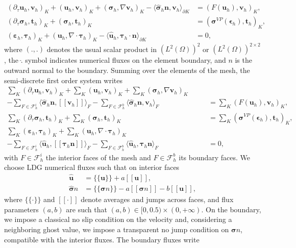 \documentclass[11pt]{article}
\newcommand{\bu}{\mathbf{u}}
\newcommand{\bt}{\mathbf{t}}
\newcommand{\sig}{\boldsymbol{\sigma}}
\newcommand{\beps}{\boldsymbol{\varepsilon}}
\newcommand{\ljp}{ [\![ }
\newcommand{\rjp}{ ]\!] }
\begin{document}
\begin{align}
 ( \partial_\tau \mathbf{u}_h, \mathbf{v}_h)_K + ( \mathbf{u}_h, \mathbf{v}_h)_K+ (\boldsymbol{\sigma}_h, \nabla \mathbf{v}_h)_K-
\langle \widehat{\boldsymbol{\sigma}}_h  \mathbf{n}, \mathbf{v}_h \rangle_{\partial K}& = ( F(\mathbf{u}_h), \mathbf{v}_h)_K, \\
 (\partial_\tau \boldsymbol{\sigma}_h, \bt_h)_K
+
(\boldsymbol{\sigma}_h, \bt_h)_K
&= (\boldsymbol{\sigma}^{VP}(\mathbf{\epsilon}_h), \bt_h)_K,  \\
   (\mathbf{\beps}_h, \boldsymbol{\tau}_h)_K
+(\mathbf{u}_h, \nabla \cdot \boldsymbol{\tau}_h)_K-
\langle \widehat{\mathbf{u}}_h, \boldsymbol{\tau}_h \cdot \mathbf{n} \rangle_{\partial K}&=0,
\end{align}
where $(.,.)$ denotes the usual scalar product in $(L^2(\Omega))^2$ or $(L^2(\Omega))^{2\times2}$, the $\hat{.}$ symbol indicates numerical fluxes on the element boundary, and $n$ is the outward normal to the boundary. Summing over the elements of the mesh, the semi-discrete first order system writes 
\begin{align}
 \sum_{K} ( \partial_\tau \mathbf{u}_h, \mathbf{v}_h)_K+ \sum_{K} (\mathbf{u}_h, \mathbf{v}_h)_K
+ \sum_{K} (\boldsymbol{\sigma}_h, \nabla \mathbf{v}_h)_K
\qquad \nonumber
\\
-\sum_{F \in \mathcal{F}_h^i} \langle \widehat{\boldsymbol{\sigma}}_h \mathbf{n}, \ljp \mathbf{v}_h  \rjp\rangle_{F} -\sum_{F \in \mathcal{F}_h^b} \langle \widehat{\boldsymbol{\sigma}}_h \mathbf{n}, \mathbf{v}_h \rangle_{F}
&= \sum_{K} (F(\bu_h), \mathbf{v}_h)_K, \label{u line}
\\
 \sum_K (\partial_\tau \boldsymbol{\sigma}_h, \bt_h)_K
+
\sum_K (\boldsymbol{\sigma}_h, \bt_h)_K
&= \sum_K (\boldsymbol{\sigma}^{VP}(\mathbf{\epsilon}_h), \bt_h)_K, \label{sig line}\\
 \sum_{K} (\beps_h, \boldsymbol{\tau}_h)_K
+ \sum_{K} (\bu_h, \nabla \cdot \boldsymbol{\tau}_h)_K \qquad\qquad\nonumber\\
- \sum_{F \in \mathcal{F}_h^i} \langle \widehat{\mathbf{u}}_h, \ljp \boldsymbol{\tau}_h \mathbf{n} \rjp \rangle_{F} - \sum_{F \in \mathcal{F}_h^b} \langle \widehat{\mathbf{u}}_h,  \boldsymbol{\tau}_h \mathbf{n} \rangle_{F}&=0, \label{eps line}
\end{align}
%
with $F\in \mathcal{F}_h^i$ the interior faces of the mesh and $F\in \mathcal{F}_h^b$ its boundary faces. 
We choose LDG \cite{cockburn1998local, di2011mathematical} numerical fluxes such that on interior faces
\begin{align}
\widehat{\mathbf{u}} &= \{\!\{\bu \}\!\} + a \ljp \bu\rjp, \\
\widehat{\sig} n
&=
\{\!\{\sig n\}\!\} - a \ljp \sig n \rjp
- b [\![\bu]\!],
\end{align}where $\{\!\{\cdot\}\!\}$ and $[\![\cdot]\!]$ denote averages and jumps across faces, and flux parameters $(a, b)$ are such that $(a, b) \in [0, 0.5)\times (0, +\infty)$. On the boundary, we impose a classical no slip condition on the velocity and, considering a neighboring ghost value, we impose a transparent no jump condition on $\sig n$, compatible with the interior fluxes. The boundary fluxes write
\end{document}
